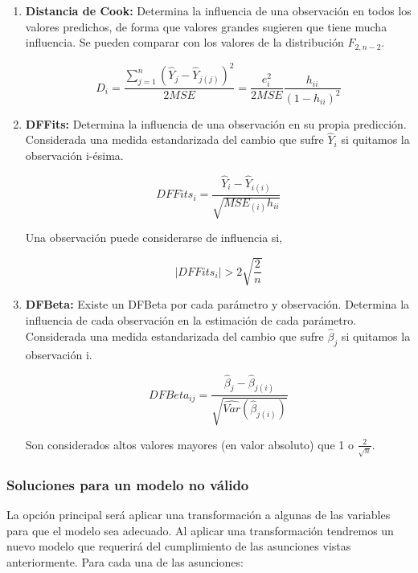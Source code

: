 \begin{enumerate}
    \item \textbf{Distancia de Cook: }Determina la influencia de una observación en todos los valores predichos, de forma que valores grandes sugieren que tiene mucha influencia. Se pueden comparar con los valores de la distribución $F_{2,n-2}$.
    
    $$
    D_i=\frac{\displaystyle\sum_{j=1}^{n}(\hat Y_j-\hat Y_{j(j)})^2}{2MSE}=\frac{e_i^2}{2MSE}\frac{h_{ii}}{(1-h_{ii})^2}
    $$

    \item \textbf{DFFits: }Determina la influencia de una observación en su propia predicción. Considerada una medida estandarizada del cambio que sufre $\hat Y_i$ si quitamos la observación i-ésima.
    
    $$
    DFFits_i=\frac{\hat Y_i-\hat Y_{i(i)}}{\sqrt{MSE_{(i)}h_{ii}}}
    $$

    Una observación puede considerarse de influencia si,

    $$
    |DFFits_i|>2\sqrt{\frac{2}{n}}
    $$
    
    \item \textbf{DFBeta: }Existe un DFBeta por cada parámetro y observación. Determina la influencia de cada observación en la estimación de cada parámetro.
    Considerada una medida estandarizada del cambio que sufre $\hat\beta_j$ si quitamos la observación i.

    $$
    DFBeta_{ij}=\frac{\hat\beta_j-\hat\beta_{j(i)}}{\sqrt{\hat{Var}(\hat\beta_{j(i)})}}
    $$

    Son considerados altos valores mayores (en valor absoluto) que 1 o $\frac{2}{\sqrt{n}}$.

\end{enumerate}

\subsubsection{Soluciones para un modelo no válido}

La opción principal será aplicar una transformación a algunas de las variables para que el modelo sea adecuado. 
Al aplicar una transformación tendremos un nuevo modelo que requerirá del cumplimiento de las asunciones vistas anteriormente. Para cada una de las asunciones:

